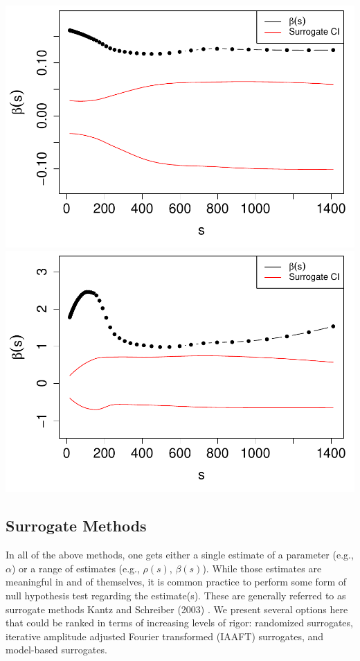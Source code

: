 \documentclass[
  man]{apa6}
\begin{document}
\includegraphics{fractal_regression_paper_brm_files/figure-latex/unnamed-chunk-26-1.pdf} \includegraphics{fractal_regression_paper_brm_files/figure-latex/unnamed-chunk-26-2.pdf}

\hypertarget{surrogate-methods}{%
\subsection{Surrogate Methods}\label{surrogate-methods}}

In all of the above methods, one gets either a single estimate of a
parameter (e.g., \(\alpha\)) or a range of estimates (e.g., \(\rho(s)\),
\(\beta(s)\)). While those estimates are meaningful in and of themselves,
it is common practice to perform some form of null hypothesis test
regarding the estimate(s). These are generally referred to as surrogate
methods Kantz and Schreiber (2003) . We present several options here that could be
ranked in terms of increasing levels of rigor: randomized surrogates,
iterative amplitude adjusted Fourier transformed (IAAFT) surrogates, and
model-based surrogates.
\end{document}

